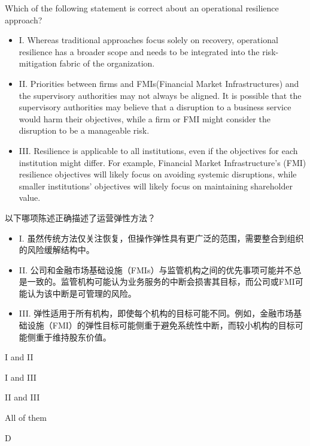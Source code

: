 \documentclass{article}
\newcounter{question} %
\begin{document}
\begin{question}
    Which of the following statement is correct about an operational resilience approach?
    \begin{itemize}
        \item I. Whereas traditional approaches focus solely on recovery, operational resilience has a broader scope and needs to be integrated into the risk-mitigation fabric of the organization.
        \item II. Priorities between firms and FMIs(Financial Market Infrastructures) and the supervisory authorities may not always be aligned. It is possible that the supervisory authorities may believe that a disruption to a business service would harm their objectives, while a firm or FMI might consider the disruption to be a manageable risk.
        \item III. Resilience is applicable to all institutions, even if the objectives for each institution might differ. For example, Financial Market Infrastructure's (FMI) resilience objectives will likely focus on avoiding systemic disruptions, while smaller institutions' objectives will likely focus on maintaining shareholder value.
    \end{itemize}
    以下哪项陈述正确描述了运营弹性方法？
    \begin{itemize}
        \item I. 虽然传统方法仅关注恢复，但操作弹性具有更广泛的范围，需要整合到组织的风险缓解结构中。
        \item II. 公司和金融市场基础设施（FMIs）与监管机构之间的优先事项可能并不总是一致的。监管机构可能认为业务服务的中断会损害其目标，而公司或FMI可能认为该中断是可管理的风险。
        \item III. 弹性适用于所有机构，即使每个机构的目标可能不同。例如，金融市场基础设施（FMI）的弹性目标可能侧重于避免系统性中断，而较小机构的目标可能侧重于维持股东价值。
    \end{itemize}
\end{question}

\begin{choices}
    \item I and II
    \item I and III
    \item II and III
    \item All of them
\end{choices}

\begin{correctanswer}
    D
\end{correctanswer}
\end{document}
